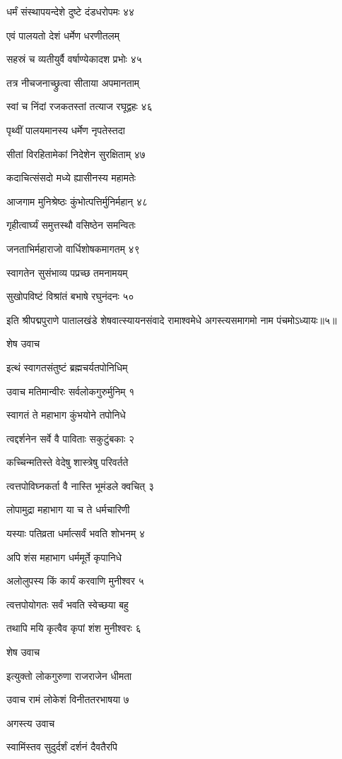 धर्मं संस्थापयन्देशे दुष्टे दंडधरोपमः ४४

एवं पालयतो देशं धर्मेण धरणीतलम्

सहस्रं च व्यतीयुर्वै वर्षाण्येकादश प्रभोः ४५

तत्र नीचजनाच्छ्रुत्वा सीताया अपमानताम्

स्वां च निंदां रजकतस्तां तत्याज रघूद्वहः ४६

पृथ्वीं पालयमानस्य धर्मेण नृपतेस्तदा

सीतां विरहितामेकां निदेशेन सुरक्षिताम् ४७

कदाचित्संसदो मध्ये ह्यासीनस्य महामतेः

आजगाम मुनिश्रेष्ठः कुंभोत्पत्तिर्मुनिर्महान् ४८

गृहीत्वार्घ्यं समुत्तस्थौ वसिष्ठेन समन्वितः

जनताभिर्महाराजो वार्धिशोषकमागतम् ४९

स्वागतेन सुसंभाव्य पप्रच्छ तमनामयम्

सुखोपविष्टं विश्रांतं बभाषे रघुनंदनः ५०

इति श्रीपद्मपुराणे पातालखंडे शेषवात्स्यायनसंवादे रामाश्वमेधे अगस्त्यसमागमो नाम पंचमोऽध्यायः॥५॥


शेष उवाच

इत्थं स्वागतसंतुष्टं ब्रह्मचर्यतपोनिधिम्

उवाच मतिमान्वीरः सर्वलोकगुरुर्मुनिम् १

स्वागतं ते महाभाग कुंभयोने तपोनिधे

त्वद्दर्शनेन सर्वे वै पाविताः सकुटुंबकाः २

कच्चिन्मतिस्ते वेदेषु शास्त्रेषु परिवर्तते

त्वत्तपोविघ्नकर्ता वै नास्ति भूमंडले क्वचित् ३

लोपामुद्रा महाभाग या च ते धर्मचारिणी

यस्याः पतिव्रता धर्मात्सर्वं भवति शोभनम् ४

अपि शंस महाभाग धर्ममूर्ते कृपानिधे

अलोलुपस्य किं कार्यं करवाणि मुनीश्वर ५

त्वत्तपोयोगतः सर्वं भवति स्वेच्छया बहु

तथापि मयि कृत्वैव कृपां शंश मुनीश्वरः ६

शेष उवाच

इत्युक्तो लोकगुरुणा राजराजेन धीमता

उवाच रामं लोकेशं विनीततरभाषया ७

अगस्त्य उवाच

स्वामिंस्तव सुदुर्दर्शं दर्शनं दैवतैरपि

